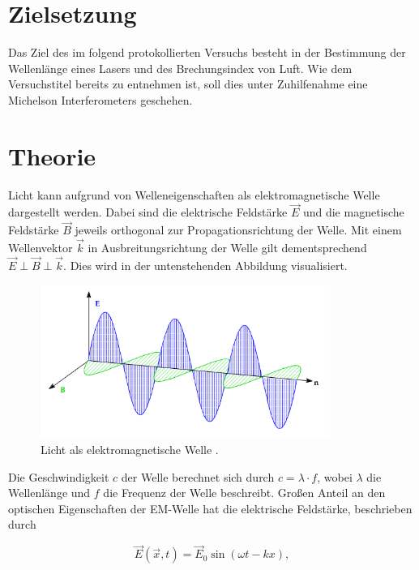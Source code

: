 %


%

\section{Zielsetzung}
\label{Zielsetzung}

\noindent Das Ziel des im folgend protokollierten Versuchs besteht in der Bestimmung der Wellenlänge eines Lasers und des 
Brechungsindex von Luft. Wie dem Versuchstitel bereits zu entnehmen ist, soll dies unter Zuhilfenahme eine Michelson 
Interferometers geschehen.

\section{Theorie}
\label{sec:Theorie}

Licht kann aufgrund von Welleneigenschaften als elektromagnetische Welle dargestellt werden. Dabei sind die elektrische 
Feldstärke $\vec{E}$ und die magnetische Feldstärke $\vec{B}$ jeweils orthogonal zur Propagationsrichtung der Welle. Mit einem 
Wellenvektor $\vec{k}$ in Ausbreitungsrichtung der Welle gilt dementsprechend $\vec{E} \perp \vec{B} \perp \vec{k}$. Dies wird in 
der untenstehenden Abbildung visualisiert.

\begin{figure}
    \centering
    \includegraphics[height=5cm]{content/EM_Welle.png}
    \caption{Licht als elektromagnetische Welle \cite{Versuchsanleitung_v401}.}
    \label{fig:EMWelle}
\end{figure}

\noindent Die Geschwindigkeit $c$ der Welle berechnet sich durch $c = \lambda\cdot{}f$, wobei $\lambda$ die Wellenlänge und $f$ die Frequenz 
der Welle beschreibt. Großen Anteil an den optischen Eigenschaften der EM-Welle hat die elektrische Feldstärke, beschrieben durch 

\begin{equation*}
    \vec{E}\left(\vec{x},t\right) = \vec{E}_0\sin\left(\omega{}t - kx\right),
\end{equation*}

